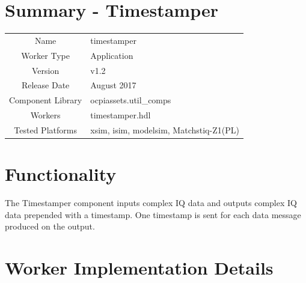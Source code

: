 \documentclass{article}
\author{} %
\date{Version \docVersion} %
\title{\docTitle}
\def\docVersion{1.2}
\def\comp{timestamper}
\def\Comp{Timestamper}
\begin{document}
\section*{Summary - \Comp}
\begin{tabular}{|c|M{13.5cm}|}
	\hline
	                  &                        \\
	\hline
	Name              & \comp                  \\
	\hline
	Worker Type       & Application            \\
	\hline
	Version           & v\docVersion \\
	\hline
	Release Date      & August 2017 \\
	\hline
	Component Library & ocpiassets.util\_comps \\
	\hline
	Workers           & \comp.hdl              \\
	\hline
	Tested Platforms  & xsim, isim, modelsim, Matchstiq-Z1(PL) \\
	\hline
\end{tabular}

\section*{Functionality}
\begin{flushleft}
	The Timestamper component inputs complex IQ data and outputs complex IQ data prepended with a timestamp. One timestamp is sent for each data message produced on the output.
\end{flushleft}

\section*{Worker Implementation Details}
\end{document}
